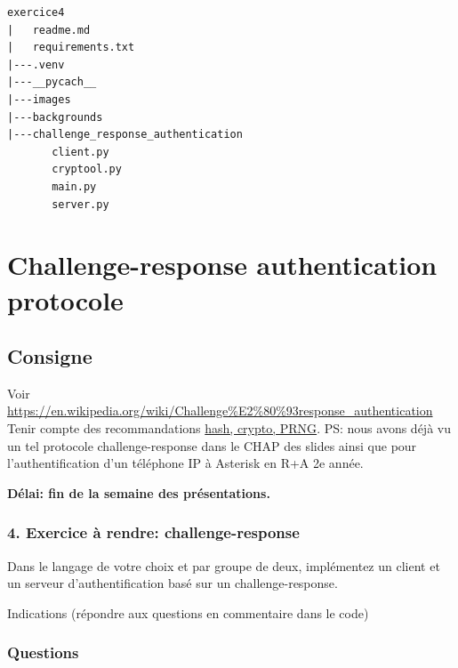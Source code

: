 \documentclass[
  french,
  paper=a4,
  ,captions=tableheading
]{scrartcl}
\renewenvironment{quote}{\begin{customblockquote}\list{}{\rightmargin=0em\leftmargin=0em}%
\item\relax\color{blockquote-text}\ignorespaces}{\unskip\unskip\endlist\end{customblockquote}}
\begin{document}
\begin{verbatim}
exercice4
|   readme.md
|   requirements.txt
|---.venv
|---__pycach__
|---images
|---backgrounds
|---challenge_response_authentication
       client.py
       cryptool.py
       main.py
       server.py
\end{verbatim}

\newpage

\hypertarget{challenge-response-authentication-protocole}{%
\section{Challenge-response authentication
protocole}\label{challenge-response-authentication-protocole}}

\hypertarget{consigne}{%
\subsection{Consigne}\label{consigne}}

\begin{quote}
Voir
\url{https://en.wikipedia.org/wiki/Challenge\%E2\%80\%93response_authentication}
Tenir compte des recommandations
\href{02_Authentification/autres/nma-hash-crypt-PRNG-recommandations.pdf}{hash,
crypto, PRNG}. PS: nous avons déjà vu un tel protocole
challenge-response dans le CHAP des slides ainsi que pour
l'authentification d'un téléphone IP à Asterisk en R+A 2e année.
\end{quote}

\textbf{Délai: fin de la semaine des présentations.}


\hypertarget{exercice-uxe0-rendre-challenge-response}{%
\subsubsection{4. Exercice à rendre:
challenge-response}\label{exercice-uxe0-rendre-challenge-response}}

Dans le langage de votre choix et par groupe de deux, implémentez un
client et un serveur d'authentification basé sur un challenge-response.

Indications (répondre aux questions en commentaire dans le code)

\hypertarget{questions}{%
\subsubsection{Questions}\label{questions}}
\end{document}
